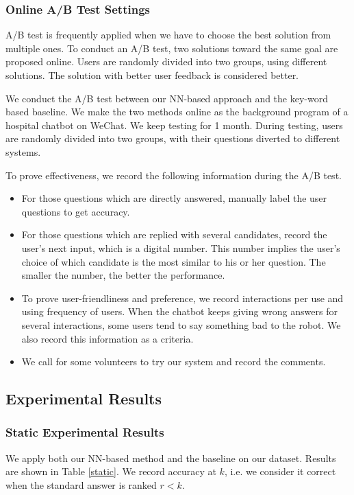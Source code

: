 \documentclass[a4paper,10pt]{article}
\begin{document}
\subsubsection{Online A/B Test Settings}
\par A/B test is frequently applied when we have to choose the best solution from multiple ones. To conduct an A/B test, two solutions toward the same goal are proposed online. Users are randomly divided into two groups, using different solutions. The solution with better user feedback is considered better.
\par We conduct the A/B test between our NN-based approach and the key-word based baseline. We make the two methods online as the background program of a hospital chatbot on WeChat. We keep testing for 1 month. During testing, users are randomly divided into two groups, with their questions diverted to different systems.
\par To prove effectiveness, we record the following information during the A/B test.
\begin{itemize}
\item For those questions which are directly answered, manually label the user questions to get accuracy.
\item For those questions which are replied with several candidates, record the user's next input, which is a digital number. This number implies the user's choice of which candidate is the most similar to his or her question. The smaller the number, the better the performance. 
\item To prove user-friendliness and preference, we record interactions per use and using frequency of users. When the chatbot keeps giving wrong answers for several interactions, some users tend to say something bad to the robot. We also record this information as a criteria.
\item We call for some volunteers to try our system and record the comments.
\end{itemize}


\subsection{Experimental Results}
\subsubsection{Static Experimental Results}
\par We apply both our NN-based method and the baseline on our dataset. Results are shown in Table \ref{static}. We record accuracy at $k$, i.e. we consider it correct when the standard answer is ranked $r<k$.
\end{document}
